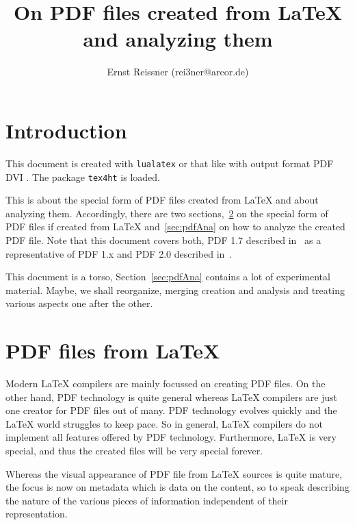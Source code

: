 \documentclass[a4paper, USenglish]{article}%
\title{On PDF files created from \LaTeX{} and analyzing them  }
\author{Ernst Reissner (rei3ner@arcor.de)}
\date{\Today}
\begin{document}
\maketitle
\tableofcontents


\section{Introduction}\label{sec:intro}

This document is created with \texttt{lualatex} or that like 
with output format 
\ifpdf%
PDF%
\else
DVI%
\fi.
The package \texttt{tex4ht} 
is  loaded. 


This is about the special form of PDF files created from \LaTeX{} 
and about analyzing them. 
Accordingly, there are two sections,~\ref{sec:pdfFromLatex} on the special form of PDF files 
if created from \LaTeX{} and~\ref{sec:pdfAna} on how to analyze the created PDF file. 
Note that this document covers both, PDF 1.7 described in~\cite{Pdf17} as a representative of PDF 1.x 
and PDF 2.0 described in~\cite{Pdf20}. 

This document is a torso, Section~\ref{sec:pdfAna} contains a lot of experimental material. 
Maybe, we shall reorganize, merging creation and analysis and treating various aspects one after the other. 


\section{PDF files from \LaTeX}\label{sec:pdfFromLatex}

Modern \LaTeX{} compilers are mainly focussed on creating PDF files. 
On the other hand, PDF technology is quite general 
whereas \LaTeX{} compilers are just one creator for PDF files out of many. 
PDF technology evolves quickly and the \LaTeX{} world struggles to keep pace. 
So in general, \LaTeX{} compilers do not implement all features offered by PDF technology. 
Furthermore, \LaTeX{} is very special, and thus the created files will be very special forever. 

Whereas the visual appearance of PDF file from \LaTeX{} sources is quite mature, 
the focus is now on metadata which is data on the content, so to speak describing the nature of the various pieces of information 
independent of their representation. 
\end{document}
